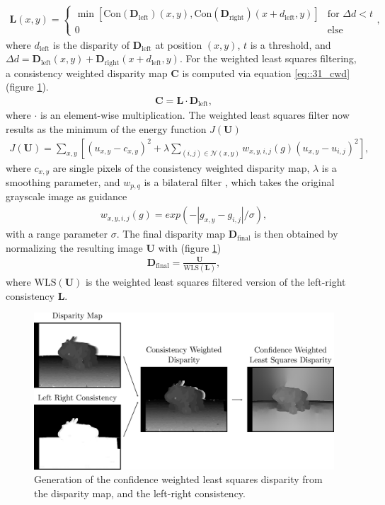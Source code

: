 \begin{align}
	\bm{L}(x, y) = 
	\begin{cases}
	\min \left[\text{Con}(\bm{D}_\text{left})(x, y), \text{Con}(\bm{D}_\text{right})(x + d_\text{left}, y)\right] & \text{for } \Delta d < t  \\
	0 & \text{else}
	\end{cases},
\end{align}
where $d_\text{left}$ is the disparity of $\bm{D}_\text{left}$ at position $(x,y)$, $t$ is a threshold, and $\Delta d = \bm{D}_\text{left}(x, y) + \bm{D}_\text{right}(x + d_\text{left}, y)$. For the weighted least squares filtering, a consistency weighted disparity map $\bm{C}$ is computed via equation \ref{eq::31_cwd} (figure \ref{fig::31_weighted_least_squares_disparity}).
\begin{align}
	\bm{C}=\bm{L}\cdot\bm{D}_\text{left},
	\label{eq::31_cwd}
\end{align}
where $\cdot$ is an element-wise multiplication. The weighted least squares filter now results as the minimum of the energy function $J(\bm{U})$
\begin{align}
	J(\bm{U}) = \sum_{x,y}\left[(u_{x,y}-c_{x,y})^2+\lambda\sum_{(i,j)\in\mathcal{N}(x,y)}w_{x,y,i,j}(g)(u_{x,y}-u_{i,j})^2\right],
	\label{eq::31_energy_function}
\end{align}
where $c_{x,y}$ are single pixels of the consistency weighted disparity map, $\lambda$ is a smoothing parameter, and $w_{p,q}$ is a bilateral filter \cite{tomasi1998bilateral}, which takes the original grayscale image as guidance
\begin{align}
w_{x,y,i,j}(g) = exp(-|g_{x,y}-g_{i,j}|/\sigma),
\label{eq::31_weight}
\end{align}
with a range parameter $\sigma$. The final disparity map $\bm{D}_\text{final}$ is then obtained by normalizing the resulting image $\bm{U}$ with (figure \ref{fig::31_weighted_least_squares_disparity})
\begin{align}
	\bm{D}_\text{final} = \frac{\bm{U}}{\text{WLS}(\bm{L})},
	\label{eq::31_wls_final}
\end{align}
where $\text{WLS}(\bm{U})$ is the weighted least squares filtered version of the left-right consistency $\bm{L}$.
\begin{figure}[h!]
	\centering
	\includegraphics[scale=.28]{chapters/03_fundamentals_of_image_processing/img/weighted_least_squares_disparity.png}
	\caption{Generation of the confidence weighted least squares disparity from the disparity map, and the left-right consistency.}
	\label{fig::31_weighted_least_squares_disparity}
\end{figure}
